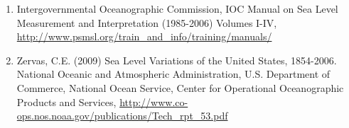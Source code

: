 \documentclass[10pt]{amsart}
\begin{document}
\begin{enumerate}
\item Intergovernmental Oceanographic Commission, IOC Manual on Sea Level Measurement and Interpretation (1985-2006) Volumes I-IV, \url{http://www.psmsl.org/train_and_info/training/manuals/}
\item Zervas, C.E. (2009) Sea Level Variations of the United States, 1854-2006. National Oceanic and Atmospheric Administration, U.S. Department of Commerce, National Ocean Service, Center for Operational Oceanographic Products and Services, \url{http://www.co-ops.nos.noaa.gov/publications/Tech_rpt_53.pdf}
\end{enumerate}
\end{document}
